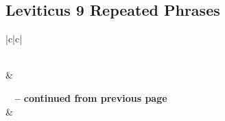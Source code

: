\subsection{Leviticus 9 Repeated Phrases}


\normalsize
 
\begin{center}
\begin{longtable}{|c|c|}
\caption[Leviticus 9 Repeated Phrases]{Leviticus 9 Repeated Phrases}\label{table:Repeated Phrases Leviticus 9} \\
\hline {} &  \\ \hline 
\endfirsthead
 
{{\bfseries \tablename\ \thetable{} -- continued from previous page}} \\  
\hline {} &  \\ \hline 
\endhead
 

\end{longtable}
\end{center}
